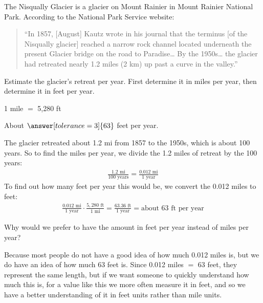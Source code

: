 \documentclass[12pt]{ximera}
\begin{document}
\begin{problem}
The Nisqually Glacier is a glacier on Mount Rainier in Mount Rainier National Park.
According to the National Park Service website:

\begin{quote}
``In 1857, [August] Kautz wrote in his journal that the terminus [of the Nisqually
glacier] reached a narrow rock channel located underneath the present Glacier bridge on
the road to Paradise\ldots{} By the 1950s\ldots{} the glacier had retreated nearly 1.2
miles (2 km) up past a curve in the valley.''
\end{quote}

Estimate the glacier's retreat per year. First determine it in miles per year, then
determine it in feet per year.

\hspace{1em} 1 mile $=$ 5,280 ft

About $\answer[tolerance=3]{63}$ feet per year.

\begin{freeResponse}
\end{freeResponse}

\begin{solution}
The glacier retreated about 1.2 mi from 1857 to the 1950s, which is about 100 years. So
to find the miles per year, we divide the 1.2 miles of retreat by the 100 years:
\begin{gather*}
\frac{1.2\text{ mi}}{100\text{ years}} = \frac{0.012\text{ mi}}{1\text{ year}}
\end{gather*}
To find out how many feet per year this would be, we convert the 0.012 miles to feet:
\begin{gather*}
\frac{0.012\text{ mi}}{1\text{ year}} \cdot \frac{5{,}280\text{ ft}}{1\text{ mi}}
= \frac{63.36\text{ ft}}{1\text{ year}} = \text{about 63 ft per year}
\end{gather*}
\end{solution}
\end{problem}

\begin{problem}
Why would we prefer to have the amount in feet per year instead of miles per year?

\begin{freeResponse}
\end{freeResponse}

\begin{solution}
Because most people do not have a good idea of how much 0.012 miles is, but we do have
an idea of how much 63 feet is. Since 0.012 miles $=$ 63 feet, they represent the same
length, but if we want someone to quickly understand how much this is, for a value like
this we more often measure it in feet, and so we have a better understanding of it in
feet units rather than mile units.
\end{solution}
\end{problem}
\end{document}

